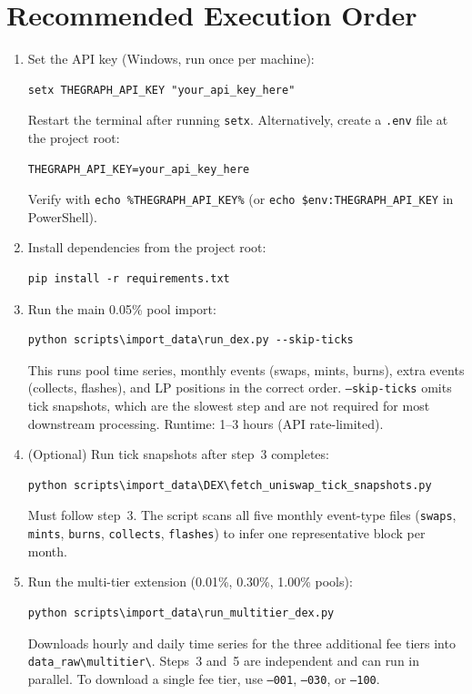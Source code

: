 \documentclass[11pt,a4paper]{article}
\begin{document}
\section{Recommended Execution Order}
\label{sec:exec}

\begin{enumerate}
  \item Set the API key (Windows, run once per machine):
\begin{lstlisting}
setx THEGRAPH_API_KEY "your_api_key_here"
\end{lstlisting}
  Restart the terminal after running \texttt{setx}.
  Alternatively, create a \texttt{.env} file at the project root:
\begin{lstlisting}
THEGRAPH_API_KEY=your_api_key_here
\end{lstlisting}
  Verify with \texttt{echo \%THEGRAPH\_API\_KEY\%} (or
  \texttt{echo \$env:THEGRAPH\_API\_KEY} in PowerShell).

  \item Install dependencies from the project root:
\begin{lstlisting}
pip install -r requirements.txt
\end{lstlisting}

  \item Run the main 0.05\% pool import:
\begin{lstlisting}
python scripts\import_data\run_dex.py --skip-ticks
\end{lstlisting}
  This runs pool time series, monthly events (swaps, mints, burns),
  extra events (collects, flashes), and LP positions in the correct
  order. \texttt{--skip-ticks} omits tick snapshots, which are the
  slowest step and are not required for most downstream processing.
  Runtime: 1--3 hours (API rate-limited).

  \item (Optional) Run tick snapshots after step~3 completes:
\begin{lstlisting}
python scripts\import_data\DEX\fetch_uniswap_tick_snapshots.py
\end{lstlisting}
  Must follow step~3. The script scans all five monthly event-type
  files (\texttt{swaps}, \texttt{mints}, \texttt{burns},
  \texttt{collects}, \texttt{flashes}) to infer one representative
  block per month.

  \item Run the multi-tier extension (0.01\%, 0.30\%, 1.00\% pools):
\begin{lstlisting}
python scripts\import_data\run_multitier_dex.py
\end{lstlisting}
  Downloads hourly and daily time series for the three additional fee
  tiers into \texttt{data\_raw\textbackslash multitier\textbackslash}.
  Steps~3 and~5 are independent and can run in parallel.
  To download a single fee tier, use \texttt{--001}, \texttt{--030},
  or \texttt{--100}.
\end{enumerate}
\end{document}
